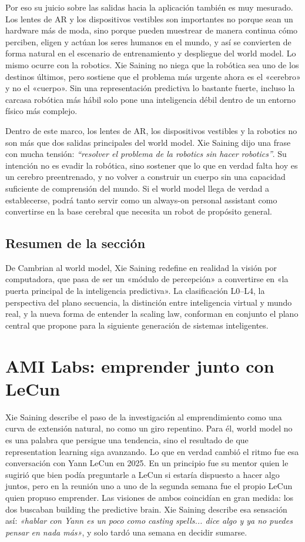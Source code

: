 \documentclass[a4paper,12pt]{article}
\begin{document}
Por eso su juicio sobre las salidas hacia la aplicación también es muy mesurado. Los lentes de AR y los dispositivos vestibles son importantes no porque sean un hardware más de moda, sino porque pueden muestrear de manera continua cómo perciben, eligen y actúan los seres humanos en el mundo, y así se convierten de forma natural en el escenario de entrenamiento y despliegue del world model. Lo mismo ocurre con la robotics. Xie Saining no niega que la robótica sea uno de los destinos últimos, pero sostiene que el problema más urgente ahora es el «cerebro» y no el «cuerpo». Sin una representación predictiva lo bastante fuerte, incluso la carcasa robótica más hábil solo pone una inteligencia débil dentro de un entorno físico más complejo.

Dentro de este marco, los lentes de AR, los dispositivos vestibles y la robotics no son más que dos salidas principales del world model. Xie Saining dijo una frase con mucha tensión: \textit{``resolver el problema de la robotics sin hacer robotics''}. Su intención no es evadir la robótica, sino sostener que lo que en verdad falta hoy es un cerebro preentrenado, y no volver a construir un cuerpo sin una capacidad suficiente de comprensión del mundo. Si el world model llega de verdad a establecerse, podrá tanto servir como un always-on personal assistant como convertirse en la base cerebral que necesita un robot de propósito general.

\subsection{Resumen de la sección}

De Cambrian al world model, Xie Saining redefine en realidad la visión por computadora, que pasa de ser un «módulo de percepción» a convertirse en «la puerta principal de la inteligencia predictiva». La clasificación L0--L4, la perspectiva del plano secuencia, la distinción entre inteligencia virtual y mundo real, y la nueva forma de entender la scaling law, conforman en conjunto el plano central que propone para la siguiente generación de sistemas inteligentes.
\section{AMI Labs: emprender junto con LeCun}

Xie Saining describe el paso de la investigación al emprendimiento como una curva de extensión natural, no como un giro repentino. Para él, world model no es una palabra que persigue una tendencia, sino el resultado de que representation learning siga avanzando. Lo que en verdad cambió el ritmo fue esa conversación con Yann LeCun en 2025. En un principio fue su mentor quien le sugirió que bien podía preguntarle a LeCun si estaría dispuesto a hacer algo juntos, pero en la reunión uno a uno de la segunda semana fue el propio LeCun quien propuso emprender. Las visiones de ambos coincidían en gran medida: los dos buscaban building the predictive brain. Xie Saining describe esa sensación así: \textit{«hablar con Yann es un poco como casting spells... dice algo y ya no puedes pensar en nada más»}, y solo tardó una semana en decidir sumarse.
\end{document}
